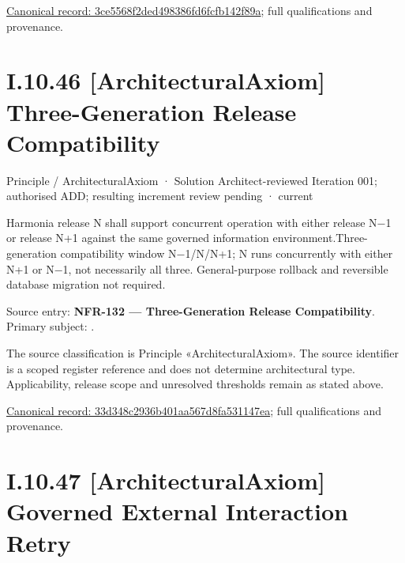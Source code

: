 {\footnotesize \href{../../../../continuum/motivation/principle/architectural-axiom/3ce5568f2ded498386fd6fcfb142f89a.md}{Canonical record: 3ce5568f2ded498386fd6fcfb142f89a}; full qualifications and provenance.}\par
\section*{I.10.46 [ArchitecturalAxiom] Three-Generation Release Compatibility}
\label{navigation:I.10.46}

\label{element:33d348c2936b401aa567d8fa531147ea}
{\small Principle / ArchitecturalAxiom · Solution Architect-reviewed Iteration 001; authorised ADD; resulting increment review pending · current}\par

Harmonia release N shall support concurrent operation with either release N−1 or release N+1 against the same governed information environment.Three-generation compatibility window N−1/N/N+1; N runs concurrently with either N+1 or N−1, not necessarily all three. General-purpose rollback and reversible database migration not required.



Source entry: \textbf{NFR-132 — Three-Generation Release Compatibility}. Primary subject: \texttt{}.



The source classification is Principle «ArchitecturalAxiom». The source identifier is a scoped register reference and does not determine architectural type. Applicability, release scope and unresolved thresholds remain as stated above.


{\footnotesize \href{../../../../continuum/motivation/principle/architectural-axiom/33d348c2936b401aa567d8fa531147ea.md}{Canonical record: 33d348c2936b401aa567d8fa531147ea}; full qualifications and provenance.}\par
\section*{I.10.47 [ArchitecturalAxiom] Governed External Interaction Retry}
\label{navigation:I.10.47}

